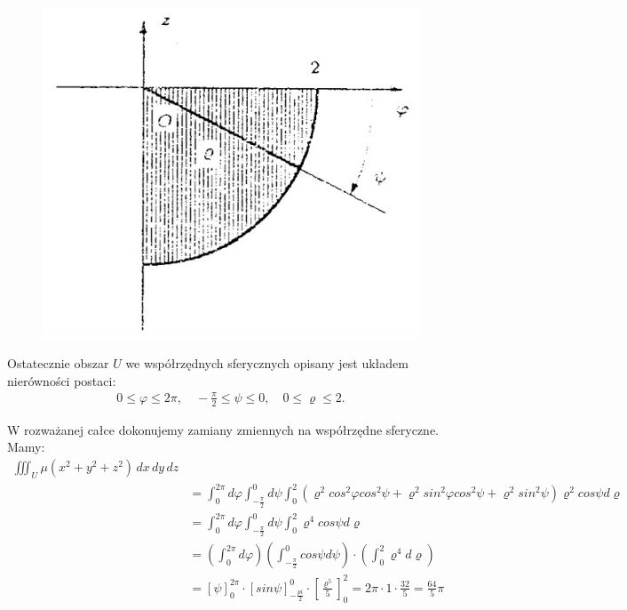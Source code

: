 \documentclass[12pt]{article}
\begin{document}
    \begin{figure}[H]
        \includegraphics[width=\linewidth/2]{28_2b.jpg}
    \end{figure}
    
    Ostatecznie obszar $U$ we współrzędnych sferycznych opisany jest układem nierówności postaci:
    \begin{align*}
        0 \leq \varphi \leq 2\pi, \quad -\frac{\pi}{2}\leq \psi \leq 0, \quad 0 \leq \varrho \leq 2.
    \end{align*}
    
    W rozważanej całce dokonujemy zamiany zmiennych na współrzędne sferyczne. Mamy:
    \begin{align*}
        \iiint_U \mu(x^2+y^2+z^2) \,dx\,dy\,dz
        \\ &= \int_{0}^{2\pi} d\varphi \int_{-\frac{\pi}{2}}^{0} d\psi \int_{0}^{2} (\varrho^2 cos^2\varphi cos^2\psi+\varrho^2sin^2\varphi cos^2\psi + \varrho^2sin^2\psi) \varrho^2cos\psi d\varrho 
        \\ &= \int_{0}^{2\pi} d\varphi \int_{-\frac{\pi}{2}}^{0} d\psi \int_{0}^{2} \varrho^4cos\psi d\varrho
        \\ &= \left(\int_{0}^{2\pi} d\varphi\right) \left(\int_{-\frac{\pi}{2}}^{0} cos\psi d\psi\right)\cdot \left(\int_{0}^{2} \varrho^4 d\varrho \right)
        \\ &= \left[\psi\right]_0^{2\pi} \cdot \left[sin\psi\right]_{-\frac{pi}{2}}^0 \cdot \left[\frac{\varrho ^5}{5}\right]_0^2 = 2\pi \cdot 1 \cdot \frac{32}{5}=\frac{64}{5}\pi
    \end{align*}
    
\end{document}
